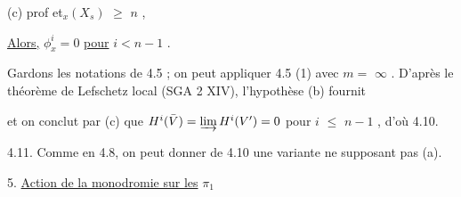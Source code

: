 (c)  prof et$_x(X_s)$ $\geqslant$ $n$ ,

\underline{Alors,} $\phi^i_x = 0$ \underline{pour}  $i < n-1$ .

Gardons les notations de 4.5 ; on peut appliquer 4.5 (1) avec  $m =$ $\infty$ . D'après le théorème de Lefschetz local  (SGA 2 XIV), l'hypothèse (b) fournit

\begin{center}
\end{center}
et on conclut par (c) que  $H^i(\bar{V}) = \varinjlim H^i(V') = 0$  pour  $i$ $\leqslant$ $n-1$ , d'où 4.10.

4.11.  Comme en 4.8, on peut donner de 4.10 une variante ne supposant pas (a).



5.  \underline{Action de la monodromie sur les}  $\pi_1$

